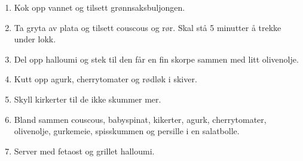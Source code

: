 \begin{enumerate}
    \item 
    Kok opp vannet og tilsett grønnsaksbuljongen.
    
    \item 
    Ta gryta av plata og tilsett couscous og rør. Skal stå 5 minutter å trekke under lokk.
    
    \item 
    Del opp halloumi og stek til den får en fin skorpe sammen med litt olivenolje.
    
    \item 
    Kutt opp agurk, cherrytomater og rødløk i skiver. 
    
    \item
    Skyll kirkerter til de ikke skummer mer.
    
    \item
    Bland sammen couscous, babyspinat, kikerter, agurk, cherrytomater, olivenolje, gurkemeie, spisskummen og persille i en salatbolle. 
    
    \item
    Server med fetaost og grillet halloumi.
\end{enumerate}